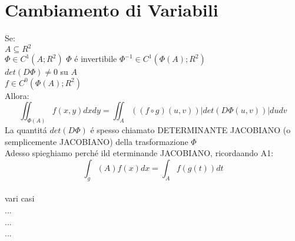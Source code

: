 \section{Cambiamento di Variabili}
Se:\\
$A\subseteq R^2$\\
$\varPhi\in C^1(A;R^2)$
$\varPhi$ \'e invertibile
$\varPhi^{-1}\in C^1(\varPhi(A);R^2)$\\
$det(D\varPhi)\ne 0$ su $A$\\
$f\in C^0(\varPhi(A);R^2)$\\
Allora:\\
$$ \iint_{\varPhi(A)}f(x,y)dxdy=\iint_A((f\circ g)(u,v))|det(D\varPhi(u,v))|dudv$$
La quantit\'a $det(D\varPhi)$ \'e spesso chiamato DETERMINANTE JACOBIANO (o semplicemente JACOBIANO) della trasformazione $\varPhi$\\
Adesso spieghiamo perch\'e ild eterminande JACOBIANO, ricordaando A1:
$$ \int_g(A)f(x)dx = \int_Af(g(t))dt$$\\
vari casi\\
...\\
...\\
...\\



